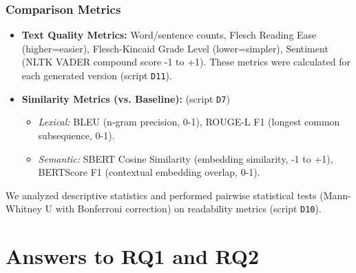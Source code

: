 \documentclass[conference]{IEEEtran}
\begin{document}
\subsubsection{Comparison Metrics}
\begin{itemize}[noitemsep, topsep=0pt]
    \item \textbf{Text Quality Metrics:} Word/sentence counts, Flesch Reading Ease (higher=easier), Flesch-Kincaid Grade Level (lower=simpler)\cite{kincaid1975}, Sentiment (NLTK VADER compound score -1 to +1)\cite{hutto2014vader}. These metrics were calculated for each generated version (script \texttt{D11}).
    \item \textbf{Similarity Metrics (vs. Baseline):} (script \texttt{D7})
        \begin{itemize}[noitemsep]
        \item \textit{Lexical:} BLEU (n-gram precision, 0-1), ROUGE-L F1 (longest common subsequence, 0-1).
        \item \textit{Semantic:} SBERT Cosine Similarity (embedding similarity, -1 to +1), BERTScore F1 (contextual embedding overlap, 0-1).
        \end{itemize}
\end{itemize}
We analyzed descriptive statistics and performed pairwise statistical tests (Mann-Whitney U with Bonferroni correction) on readability metrics (script \texttt{D10}).

\section{Answers to RQ1 and RQ2}
\end{document}
